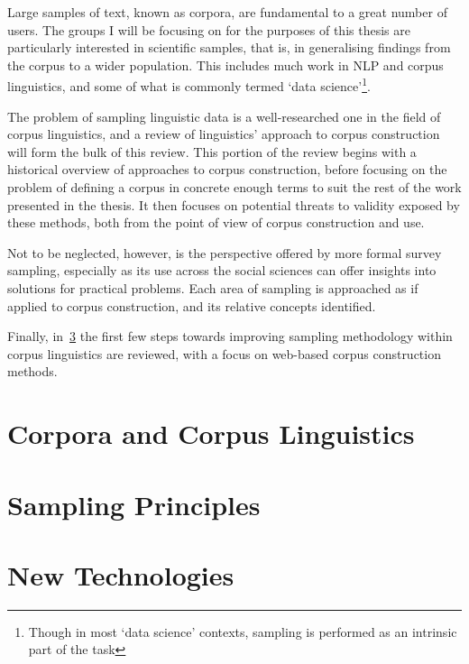 Large samples of text, known as corpora, are fundamental to a great number of users.  The groups I will be focusing on for the purposes of this thesis are particularly interested in scientific samples, that is, in generalising findings from the corpus to a wider population.  This includes much work in NLP and corpus linguistics, and some of what is commonly termed `data science'\footnote{Though in most `data science' contexts, sampling is performed as an intrinsic part of the task}.


The problem of sampling linguistic data is a well-researched one in the field of corpus linguistics, and a review of linguistics' approach to corpus construction will form the bulk of this review.  This portion of the review begins with a historical overview of approaches to corpus construction, before focusing on the problem of defining a corpus in concrete enough terms to suit the rest of the work presented in the thesis.  It then focuses on potential threats to validity exposed by these methods, both from the point of view of corpus construction and use.

Not to be neglected, however, is the perspective offered by more formal survey sampling, especially as its use across the social sciences can offer insights into solutions for practical problems.  Each area of sampling is approached as if applied to corpus construction, and its relative concepts identified.

Finally, in~\ref{sec:litreview:newtech} the first few steps towards improving sampling methodology within corpus linguistics are reviewed, with a focus on web-based corpus construction methods.




\section{Corpora and Corpus Linguistics}
\label{sec:litreview:corpora}




\section{Sampling Principles}
\label{sec:litreview:sampling}




\section{New Technologies} %
\label{sec:litreview:newtech}


